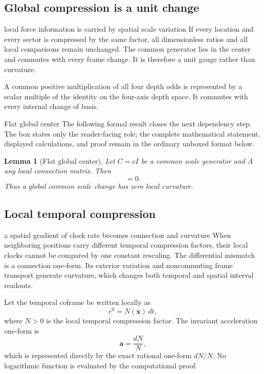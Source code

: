 \documentclass[11pt]{article}
\numberwithin{equation}{section}
\newtheorem{lemma}[definition]{Lemma}
\theoremstyle{remark}
\begin{document}
\label{sec:gravity}

\subsection{Global compression is a unit change}
\begin{interpretivebridge}{local force information is carried by spatial scale variation}
If every location and every sector is compressed by the same factor, all dimensionless ratios and all local comparisons remain unchanged. The common generator lies in the center and commutes with every frame change. It is therefore a unit gauge rather than curvature.
\end{interpretivebridge}

A common positive multiplication of all four depth odds is represented by a scalar multiple of the identity on the four-axis depth space. It commutes with every internal change of basis.

\begin{proofguide}{Flat global center}
The following formal result closes the next dependency step. The box states only the reader-facing role; the complete mathematical statement, displayed calculations, and proof remain in the ordinary unboxed format below.
\end{proofguide}
\begin{lemma}[Flat global center]
Let $C=cI$ be a common scale generator and $A$ any local connection matrix. Then
\begin{equation}
[C,A]=0.
\end{equation}
Thus a global common scale change has zero local curvature.
\end{lemma}

\subsection{Local temporal compression}
\begin{interpretivebridge}{a spatial gradient of clock rate becomes connection and curvature}
When neighboring positions carry different temporal compression factors, their local clocks cannot be compared by one constant rescaling. The differential mismatch is a connection one-form. Its exterior variation and noncommuting frame transport generate curvature, which changes both temporal and spatial interval readouts.
\end{interpretivebridge}

Let the temporal coframe be written locally as
\begin{equation}
 e^0=N(\bm x)\,dt,
\end{equation}
where $N>0$ is the local temporal compression factor. The invariant acceleration one-form is
\begin{equation}
\bm a=\frac{dN}{N},
\end{equation}
which is represented directly by the exact rational one-form $dN/N$. No logarithmic function is evaluated by the computational proof.
\end{document}
